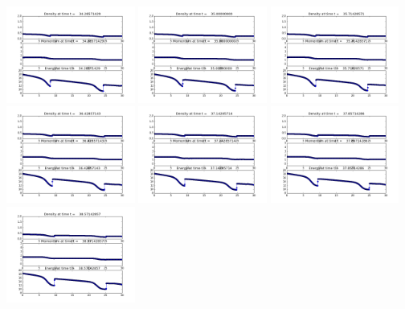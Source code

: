 \documentclass[11pt]{article}
\begin{document}
\vskip 10pt 
\includegraphics[width=0.316666666667\textwidth]{frame0048fig1.png}
\vskip 10pt 
\includegraphics[width=0.316666666667\textwidth]{frame0049fig1.png}
\vskip 10pt 
\includegraphics[width=0.316666666667\textwidth]{frame0050fig1.png}
\vskip 10pt 
\includegraphics[width=0.316666666667\textwidth]{frame0051fig1.png}
\vskip 10pt 
\includegraphics[width=0.316666666667\textwidth]{frame0052fig1.png}
\vskip 10pt 
\includegraphics[width=0.316666666667\textwidth]{frame0053fig1.png}
\vskip 10pt 
\includegraphics[width=0.316666666667\textwidth]{frame0054fig1.png}
\end{document}
